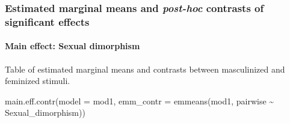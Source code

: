 \documentclass[
  bookmarksnumbered]{article}
\newenvironment{Shaded}{\begin{snugshade}}{\end{snugshade}}
\newcommand{\AttributeTok}[1]{\textcolor[rgb]{0.80,0.80,0.80}{#1}}
\newcommand{\FunctionTok}[1]{\textcolor[rgb]{0.94,0.94,0.56}{#1}}
\newcommand{\NormalTok}[1]{\textcolor[rgb]{0.80,0.80,0.80}{#1}}
\newcommand{\SpecialCharTok}[1]{\textcolor[rgb]{0.86,0.64,0.64}{#1}}
\begin{document}
\begin{table}[H]
\centering
\caption{\label{tab:tab-mod1}ANOVA-type table of fixed effects for the DFF model}
\centering
{}
\end{table}

\subsubsection{\texorpdfstring{Estimated marginal means and \emph{post-hoc} contrasts of significant effects}{Estimated marginal means and post-hoc contrasts of significant effects}}\label{estimated-marginal-means-and-post-hoc-contrasts-of-significant-effects}

\paragraph{Main effect: Sexual dimorphism}\label{main-effect-sexual-dimorphism}

Table of estimated marginal means and contrasts between masculinized and feminized stimuli.

\begin{Shaded}
\begin{Highlighting}[]
\FunctionTok{main.eff.contr}\NormalTok{(}\AttributeTok{model =}\NormalTok{ mod1,}
               \AttributeTok{emm\_contr =} \FunctionTok{emmeans}\NormalTok{(mod1, pairwise }\SpecialCharTok{\textasciitilde{}}\NormalTok{ Sexual\_dimorphism))}
\end{Highlighting}
\end{Shaded}
\end{document}

